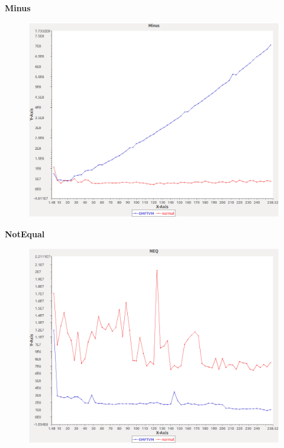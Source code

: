 \noindent\textbf{Minus}

\begin{figure}[h]
\centering
\includegraphics[width=\textwidth]{../graphs/set/Minus}
\end{figure}
\pagebreak

\noindent\textbf{NotEqual}

\begin{figure}[h]
\centering
\includegraphics[width=\textwidth]{../graphs/set/NEQ}
\end{figure}
\pagebreak

